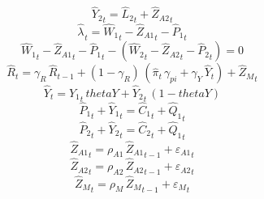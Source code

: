 \begin{dmath}
{{\hat{Y}_{2}}}_{t}={{\hat{L}_{2}}}_{t}+{{\hat{Z}_{A2}}}_{t}
\end{dmath}
\begin{dmath}
{{\hat{\lambda}_{}}}_{t}={{\hat{W}_{1}}}_{t}-{{\hat{Z}_{A1}}}_{t}-{{\hat{P}_{1}}}_{t}
\end{dmath}
\begin{dmath}
{{\hat{W}_{1}}}_{t}-{{\hat{Z}_{A1}}}_{t}-{{\hat{P}_{1}}}_{t}-\left({{\hat{W}_{2}}}_{t}-{{\hat{Z}_{A2}}}_{t}-{{\hat{P}_{2}}}_{t}\right)=0
\end{dmath}
\begin{dmath}
{{\hat{R}}}_{t}={{\gamma_{R}}}\, {{\hat{R}}}_{t-1}+\left(1-{{\gamma_{R}}}\right)\, \left({{\hat{\pi}}}_{t}\, {{\gamma_{pi}}}+{{\gamma_{Y}}}\, {{\hat{Y}}}_{t}\right)+{{\hat{Z}_M}}_{t}
\end{dmath}
\begin{dmath}
{{\hat{Y}}}_{t}={{\hat{Y}_{1}}}_{t}\, {thetaY}+{{\hat{Y}_{2}}}_{t}\, \left(1-{thetaY}\right)
\end{dmath}
\begin{dmath}
{{\hat{P}_{1}}}_{t}+{{\hat{Y}_{1}}}_{t}={{\hat{C}_{1}}}_{t}+{{\hat{Q}_{1}}}_{t}
\end{dmath}
\begin{dmath}
{{\hat{P}_{2}}}_{t}+{{\hat{Y}_{2}}}_{t}={{\hat{C}_{2}}}_{t}+{{\hat{Q}_{1}}}_{t}
\end{dmath}
\begin{dmath}
{{\hat{Z}_{A1}}}_{t}={{\rho_{A1}}}\, {{\hat{Z}_{A1}}}_{t-1}+{{\varepsilon_{A1}}}_{t}
\end{dmath}
\begin{dmath}
{{\hat{Z}_{A2}}}_{t}={{\rho_{A2}}}\, {{\hat{Z}_{A2}}}_{t-1}+{{\varepsilon_{A2}}}_{t}
\end{dmath}
\begin{dmath}
{{\hat{Z}_M}}_{t}={{\rho_{M}}}\, {{\hat{Z}_M}}_{t-1}+{{\varepsilon_{M}}}_{t}
\end{dmath}
